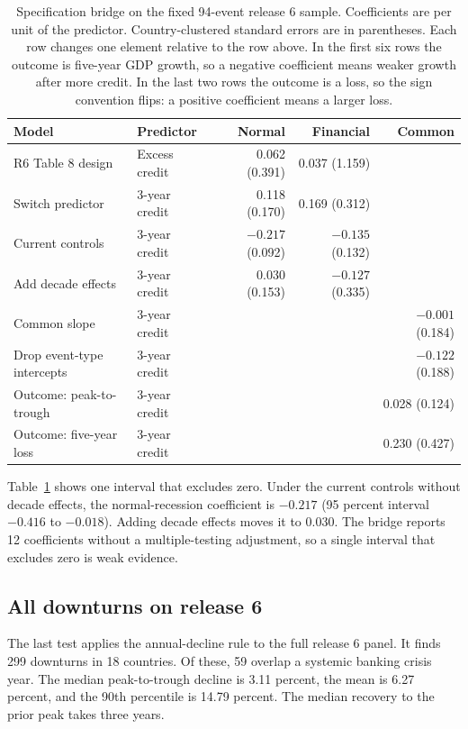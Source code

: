 \documentclass[11pt]{article}
\begin{document}
\begin{table}[htbp]
\centering
\small
\caption{Specification bridge on the fixed 94-event release 6 sample. Coefficients are per
unit of the predictor. Country-clustered standard errors are in parentheses. Each row
changes one element relative to the row above. In the first six rows the outcome is
five-year GDP growth, so a negative coefficient means weaker growth after more credit. In
the last two rows the outcome is a loss, so the sign convention flips: a positive
coefficient means a larger loss.}
\label{tab:bridge}
\begin{tabular}{p{4.2cm}p{2.6cm}rrr}
\toprule
Model & Predictor & Normal & Financial & Common \\
\midrule
R6 Table 8 design & Excess credit & 0.062 (0.391) & 0.037 (1.159) & \\
Switch predictor & 3-year credit & 0.118 (0.170) & 0.169 (0.312) & \\
Current controls & 3-year credit & $-0.217$ (0.092) & $-0.135$ (0.132) & \\
Add decade effects & 3-year credit & 0.030 (0.153) & $-0.127$ (0.335) & \\
Common slope & 3-year credit & & & $-0.001$ (0.184) \\
Drop event-type intercepts & 3-year credit & & & $-0.122$ (0.188) \\
Outcome: peak-to-trough & 3-year credit & & & 0.028 (0.124) \\
Outcome: five-year loss & 3-year credit & & & 0.230 (0.427) \\
\bottomrule
\end{tabular}
\end{table}

Table~\ref{tab:bridge} shows one interval that excludes zero. Under the current controls
without decade effects, the normal-recession coefficient is $-0.217$ (95 percent interval
$-0.416$ to $-0.018$). Adding decade effects moves it to 0.030. The bridge reports 12
coefficients without a multiple-testing adjustment, so a single interval that excludes zero
is weak evidence.

\subsection{All downturns on release 6}
The last test applies the annual-decline rule to the full release 6 panel. It finds 299
downturns in 18 countries. Of these, 59 overlap a systemic banking crisis year. The median
peak-to-trough decline is 3.11 percent, the mean is 6.27 percent, and the 90th percentile is
14.79 percent. The median recovery to the prior peak takes three years.
\end{document}

